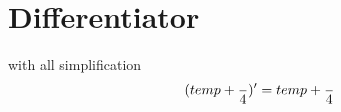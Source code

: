 \documentclass{article}
\begin{document}
\section{Differentiator}
with all simplification$$ ({ { temp } + {  {  }  \over  {  4  }  } })' = { { temp } + {  {  }  \over  {  4  }  } } $$
\end{document}
